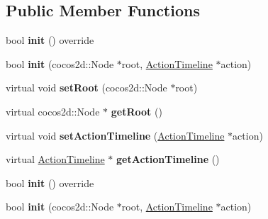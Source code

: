 \subsection*{Public Member Functions}
\begin{DoxyCompactItemize}
\item 
\mbox{\label{classActionTimelineNode_a9826575b0a21dbb8da0e8c270e09b4ca}} 
bool {\bfseries init} () override
\item 
\mbox{\label{classActionTimelineNode_a535934613be8bde8694b8caa006e73d5}} 
bool {\bfseries init} (cocos2d\+::\+Node $\ast$root, \hyperlink{classActionTimeline}{Action\+Timeline} $\ast$action)
\item 
\mbox{\label{classActionTimelineNode_a54ca58449551b1164058a37b6f853299}} 
virtual void {\bfseries set\+Root} (cocos2d\+::\+Node $\ast$root)
\item 
\mbox{\label{classActionTimelineNode_a4ac18d7c4b954b3700cdf8176fb00627}} 
virtual cocos2d\+::\+Node $\ast$ {\bfseries get\+Root} ()
\item 
\mbox{\label{classActionTimelineNode_a2e99dd2edcd6b464e2a076fdfb20f229}} 
virtual void {\bfseries set\+Action\+Timeline} (\hyperlink{classActionTimeline}{Action\+Timeline} $\ast$action)
\item 
\mbox{\label{classActionTimelineNode_a449911c27563294543825752a07601a8}} 
virtual \hyperlink{classActionTimeline}{Action\+Timeline} $\ast$ {\bfseries get\+Action\+Timeline} ()
\item 
\mbox{\label{classActionTimelineNode_a9826575b0a21dbb8da0e8c270e09b4ca}} 
bool {\bfseries init} () override
\item 
\mbox{\label{classActionTimelineNode_a535934613be8bde8694b8caa006e73d5}} 
bool {\bfseries init} (cocos2d\+::\+Node $\ast$root, \hyperlink{classActionTimeline}{Action\+Timeline} $\ast$action)
\item 
\mbox{\label{classActionTimelineNode_a01ec13660217a9069ebc60c5c2397e13}} 

\end{DoxyCompactItemize}
